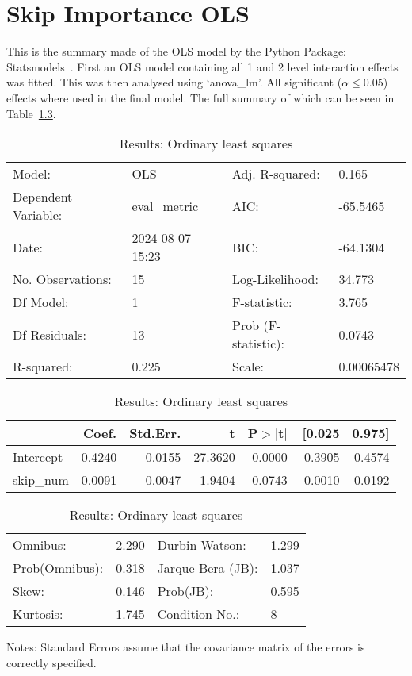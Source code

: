 \chapter{Skip Importance OLS}
\label{appendix:skip_importance_full}
This is the summary made of the OLS model by the Python Package: Statsmodels~\cite{josef_perktold_2024_10984387}. First an OLS model containing all 1 and 2 level interaction effects was fitted. This was then analysed using `anova\_lm'. All significant ($\alpha\le0.05$) effects where used in the final model. The full summary of which can be seen in Table~\ref{tab:skip_importance_full_ols}.

\begin{table}[ht]
\caption{Results: Ordinary least squares}
\label{tab:skip_importance_full_ols}
\begin{center}
\begin{tabular}{llll}
\hline
Model:              & OLS              & Adj. R-squared:     & 0.165       \\
Dependent Variable: & eval\_metric     & AIC:                & -65.5465    \\
Date:               & 2024-08-07 15:23 & BIC:                & -64.1304    \\
No. Observations:   & 15               & Log-Likelihood:     & 34.773      \\
Df Model:           & 1                & F-statistic:        & 3.765       \\
Df Residuals:       & 13               & Prob (F-statistic): & 0.0743      \\
R-squared:          & 0.225            & Scale:              & 0.00065478  \\
\hline
\end{tabular}
\end{center}

\begin{center}
\begin{tabular}{lrrrrrr}
\hline
          &  Coef. & Std.Err. &       t & P$> |$t$|$ &  [0.025 & 0.975]  \\
\hline
Intercept & 0.4240 &   0.0155 & 27.3620 &      0.0000 &  0.3905 & 0.4574  \\
skip\_num & 0.0091 &   0.0047 &  1.9404 &      0.0743 & -0.0010 & 0.0192  \\
\hline
\end{tabular}
\end{center}

\begin{center}
\begin{tabular}{llll}
\hline
Omnibus:       & 2.290 & Durbin-Watson:    & 1.299  \\
Prob(Omnibus): & 0.318 & Jarque-Bera (JB): & 1.037  \\
Skew:          & 0.146 & Prob(JB):         & 0.595  \\
Kurtosis:      & 1.745 & Condition No.:    & 8      \\
\hline
\end{tabular}
\end{center}
\end{table}
\bigskip
Notes: \newline 
[1] Standard Errors assume that the covariance matrix of the errors is correctly specified.